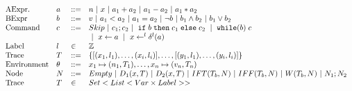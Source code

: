 \documentclass[a4paper,11pt]{article}
\newcommand{\aexpr}{a}
\newcommand{\bexpr}{b}
\newcommand{\cmd}{c}
\newcommand{\node}{N}
\newcommand{\assign}[2]{ \mathrel{ #1  \leftarrow #2 } }
\newcommand{\fassign}[3]{ \mathrel{ #1  \leftarrow^{#3}  \delta^{#3}(
    #2 ) } }
\newcommand{\ethen}{\kw{then}}
\newcommand{\eelse}{\kw{else}}
\newcommand{\impif}[3]{\mathrel{\eif \eapp #1\eapp \ethen \eapp #2 \eapp
    \eelse \eapp #3 }}
\newcommand{\impwhile}[2]{\mathrel{ \kw{while} (#1) \eapp #2 } }
\newcommand{\labl}{l}
\theoremstyle{definition}
\begin{document}
\[\begin{array}{llll}
\mbox{AExpr.} & \aexpr & ::= & n~|~ x ~|~ \aexpr_1 + \aexpr_2  ~|~  \aexpr_1 -
                            \aexpr_2 ~|~ \aexpr_1 * \aexpr_2 \\
%
\mbox{BExpr} & \bexpr & ::= & v ~|~  \aexpr_1 < \aexpr_2 ~|~ \aexpr_1
                              = \aexpr_2 ~|~ \neg \bexpr ~|~ \bexpr_1
                              \land \bexpr_2 ~|~ \bexpr_1 \lor \bexpr_2
\\
  \mbox{Command} & \cmd& ::= & Skip ~|~ \cmd_1 ; \cmd_2 ~|~ \impif{\bexpr}{\cmd_1}{\cmd_2}
                               ~|~             \impwhile{\bexpr}{\cmd}  \\
              &&& ~|~\assign{x}{\aexpr} ~|~ \fassign{x}{\aexpr}{l}  
    \\
    \mbox{Label}  & \labl & \in &  \mathbb{Z} \\
    \mbox{Trace} & T & ::= &   \{  [(x_1,\labl_1),\dots, (x_i,
                             \labl_i)],  \dots,  [(y_1,\labl_1),\dots, (y_i,
                             \labl_i)]  \}    \\
\mbox{Environment} & \env & ::= & x_1 \mapsto (n_1, T_1),
                                  \ldots, x_n \mapsto
                                  (\valr_n,T_n) \\
    \mbox{Node}  & \node & ::=&  Empty ~|~D_1(x, T) ~|~ D_2(x,T) ~|~ IFT(T_b, \node) ~|~
                                IFF(T_b, \node) ~|~ W (T_b, \node)
                                ~|~ \node_1 ; \node_2\\
                                  \mbox{Trace} & T & \in  & Set <
                                                            List<Var
                                                            \times Label> >
\end{array}\]





\end{document}
